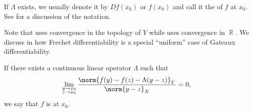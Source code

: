 \begin{definition}
\begin{defenum}
    If \( \Lambda \) exists, we usually denote it by \( D f(x_0) \) or \( f(x_0) \) and call it the  of \( f \) at \( x_0 \). See  for a discussion of the notation.

    Note that  uses convergence in the topology of \( Y \) while  uses convergence in \( \BbbR \). We discuss in  how Frechet differentiability is a special \enquote{uniform} case of Gateaux differentiability.

    \mcite\cite[33]{Dontchev2014}If there exists a continuous linear operator \( \Lambda \) such that
    \begin{equation}\label{def:differentiability/strict/condition}
      \lim_{\substack{y \to x_0 \\ z \to x_0}} \frac {\norm{f(y) - f(z) - \Lambda (y - z)}_Y} {\norm{y - z}_X} = 0,
    \end{equation}
    we say that \( f \) is  at \( x_0 \).
  \end{defenum}
\end{definition}


